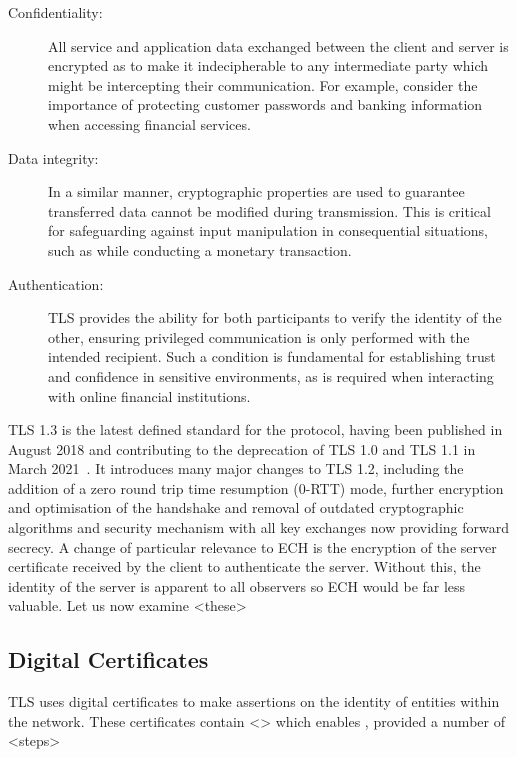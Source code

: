 \begin{description}
	\item[Confidentiality:] All service and application data exchanged between the client and server is encrypted as to make it indecipherable to any intermediate party which might be intercepting their communication. For example, consider the importance of protecting customer passwords and banking information when accessing financial services.
	\item[Data integrity:] In a similar manner, cryptographic properties are used to guarantee transferred data cannot be modified during transmission. This is critical for safeguarding against input manipulation in consequential situations, such as while conducting a monetary transaction.
	\item[Authentication:] TLS provides the ability for both participants to verify the identity of the other, ensuring privileged communication is only performed with the intended recipient. Such a condition is fundamental for establishing trust and confidence in sensitive environments, as is required when interacting with online financial institutions.
\end{description}

TLS 1.3 is the latest defined standard for the protocol, having been published in August 2018 and contributing to the deprecation of TLS 1.0 and TLS 1.1 in March 2021~\cite{rfc8446, rfc8996}. It introduces many major changes to TLS 1.2, including the addition of a zero round trip time resumption (0-RTT) mode, further encryption and optimisation of the handshake and removal of outdated cryptographic algorithms and security mechanism with all key exchanges now providing forward secrecy. A change of particular relevance to ECH is the encryption of the server certificate received by the client to authenticate the server. Without this, the identity of the server is apparent to all observers so ECH would be far less valuable. Let us now examine <these>

\subsection{Digital Certificates}

TLS uses digital certificates to make assertions on the identity of entities within the network. These certificates contain <> which enables , provided a number of <steps>

%

